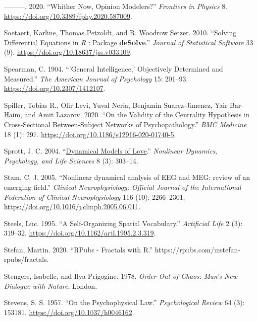 \documentclass[
  a4paper,
  DIV=11,
  numbers=noendperiod,
  oneside]{scrreprt}
\newlength{\cslhangindent}
\newenvironment{CSLReferences}[2] %
 {\begin{list}{}{%
  \setlength{\itemindent}{0pt}
  \setlength{\leftmargin}{0pt}
  \setlength{\parsep}{0pt}
  \ifodd #1
   \setlength{\leftmargin}{\cslhangindent}
   \setlength{\itemindent}{-1\cslhangindent}
  \fi
  \setlength{\itemsep}{#2\baselineskip}}}
 {\end{list}}
\begin{document}
\begin{CSLReferences}{1}{0}
---------. 2020. {``Whither {Now}, {Opinion Modelers}?''}
\emph{Frontiers in Physics} 8.
\url{https://doi.org/10.3389/fphy.2020.587009}.

Soetaert, Karline, Thomas Petzoldt, and R. Woodrow Setzer. 2010.
{``Solving Differential Equations in {\emph{R}} : Package
{\textbf{deSolve}}.''} \emph{Journal of Statistical Software} 33 (9).
\url{https://doi.org/10.18637/jss.v033.i09}.

Spearman, C. 1904. {``'{General} Intelligence,' Objectively Determined
and Measured.''} \emph{The American Journal of Psychology} 15: 201--93.
\url{https://doi.org/10.2307/1412107}.

Spiller, Tobias R., Ofir Levi, Yuval Neria, Benjamin Suarez-Jimenez,
Yair Bar-Haim, and Amit Lazarov. 2020. {``On the Validity of the
Centrality Hypothesis in Cross-Sectional Between-Subject Networks of
Psychopathology.''} \emph{BMC Medicine} 18 (1): 297.
\url{https://doi.org/10.1186/s12916-020-01740-5}.

Sprott, J. C. 2004.
{``\href{https://www.ncbi.nlm.nih.gov/pubmed/15233877}{Dynamical Models
of Love}.''} \emph{Nonlinear Dynamics, Psychology, and Life Sciences} 8
(3): 303--14.

Stam, C. J. 2005. {``Nonlinear dynamical analysis of EEG and MEG: review
of an emerging field.''} \emph{Clinical Neurophysiology: Official
Journal of the International Federation of Clinical Neurophysiology} 116
(10): 2266--2301. \url{https://doi.org/10.1016/j.clinph.2005.06.011}.

Steels, Luc. 1995. {``A {Self-Organizing Spatial Vocabulary}.''}
\emph{Artificial Life} 2 (3): 319--32.
\url{https://doi.org/10.1162/artl.1995.2.3.319}.

Stefan, Martin. 2020. {``{RPubs} - {Fractals} with {R}.''}
https://rpubs.com/mstefan-rpubs/fractals.

Stengers, Isabelle, and Ilya Prigogine. 1978. \emph{Order {Out} of
{Chaos}: {Man}'s {New Dialogue} with {Nature}}. {London}.

Stevens, S. S. 1957. {``On the Psychophysical Law.''}
\emph{Psychological Review} 64 (3): 153181.
\url{https://doi.org/10.1037/h0046162}.


\end{CSLReferences}
\end{document}
